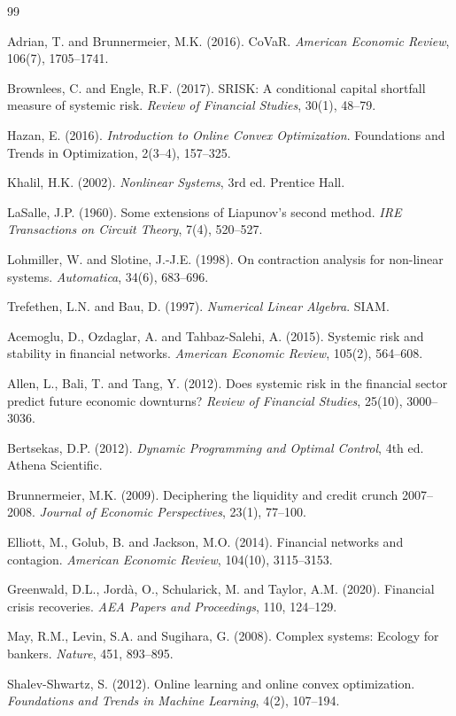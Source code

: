 \documentclass[11pt]{article}
\theoremstyle{definition}
\begin{document}

% 
\begin{thebibliography}{99}

Adrian, T. and Brunnermeier, M.K. (2016).
CoVaR.
\textit{American Economic Review}, 106(7), 1705--1741.

Brownlees, C. and Engle, R.F. (2017).
SRISK: A conditional capital shortfall measure of systemic risk.
\textit{Review of Financial Studies}, 30(1), 48--79.

Hazan, E. (2016).
\textit{Introduction to Online Convex Optimization}.
Foundations and Trends in Optimization, 2(3--4), 157--325.

Khalil, H.K. (2002).
\textit{Nonlinear Systems}, 3rd ed.
Prentice Hall.

LaSalle, J.P. (1960).
Some extensions of Liapunov's second method.
\textit{IRE Transactions on Circuit Theory}, 7(4), 520--527.

Lohmiller, W. and Slotine, J.-J.E. (1998).
On contraction analysis for non-linear systems.
\textit{Automatica}, 34(6), 683--696.

Trefethen, L.N. and Bau, D. (1997).
\textit{Numerical Linear Algebra}.
SIAM.

Acemoglu, D., Ozdaglar, A. and Tahbaz-Salehi, A. (2015).
Systemic risk and stability in financial networks.
\textit{American Economic Review}, 105(2), 564--608.

Allen, L., Bali, T. and Tang, Y. (2012).
Does systemic risk in the financial sector predict future economic downturns?
\textit{Review of Financial Studies}, 25(10), 3000--3036.

Bertsekas, D.P. (2012).
\textit{Dynamic Programming and Optimal Control}, 4th ed.
Athena Scientific.

Brunnermeier, M.K. (2009).
Deciphering the liquidity and credit crunch 2007--2008.
\textit{Journal of Economic Perspectives}, 23(1), 77--100.

Elliott, M., Golub, B. and Jackson, M.O. (2014).
Financial networks and contagion.
\textit{American Economic Review}, 104(10), 3115--3153.

Greenwald, D.L., Jordà, O., Schularick, M. and Taylor, A.M. (2020).
Financial crisis recoveries.
\textit{AEA Papers and Proceedings}, 110, 124--129.

May, R.M., Levin, S.A. and Sugihara, G. (2008).
Complex systems: Ecology for bankers.
\textit{Nature}, 451, 893--895.

Shalev-Shwartz, S. (2012).
Online learning and online convex optimization.
\textit{Foundations and Trends in Machine Learning}, 4(2), 107--194.

\end{thebibliography}
\end{document}
